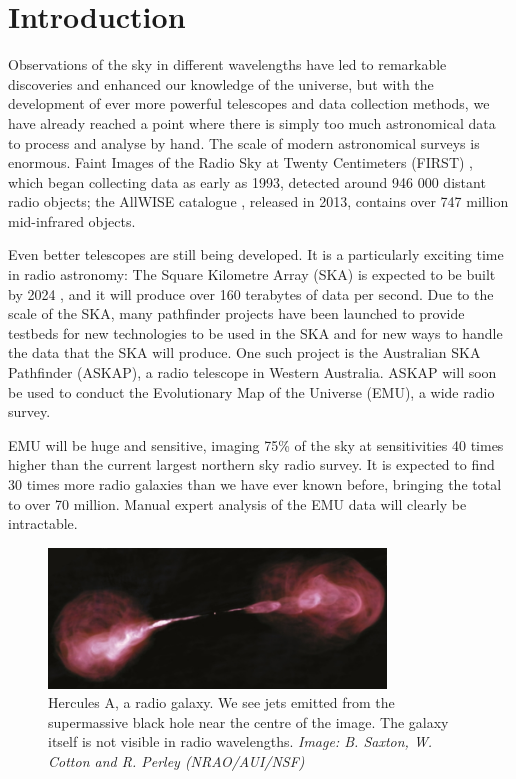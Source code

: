 
\chapter{Introduction}
\label{cha:intro}

Observations of the sky in different wavelengths have led to remarkable
discoveries and enhanced our knowledge of the universe, but with the development
of ever more powerful telescopes and data collection methods, we have already
reached a point where there is simply too much astronomical data to process and
analyse by hand. The scale of modern astronomical surveys is enormous. Faint
Images of the Radio Sky at Twenty Centimeters (FIRST) \citep{becker95}, which
began collecting data as early as 1993, detected around 946 000 distant radio
objects; the AllWISE catalogue \citep{cutri13}, released in 2013, contains over
747 million mid-infrared objects.

Even better telescopes are still being developed. It is a particularly exciting
time in radio astronomy: The Square Kilometre Array (SKA) is expected to be
built by 2024 \citep{ska}, and it will produce over 160 terabytes of data per
second. Due to the scale of the SKA, many pathfinder projects have been launched
to provide testbeds for new technologies to be used in the SKA and for new ways
to handle the data that the SKA will produce. One such project is the Australian
SKA Pathfinder (ASKAP), a radio telescope in Western Australia. ASKAP will soon
be used to conduct the Evolutionary Map of the Universe (EMU), a wide radio
survey.

EMU will be huge and sensitive, imaging 75\% of the sky at sensitivities 40
times higher than the current largest northern sky radio survey. It is expected
to find 30 times more radio galaxies than we have ever known before, bringing
the total to over 70 million. Manual expert analysis of the EMU data will
clearly be intractable.

\begin{figure}
  \centering
  \includegraphics[width=0.8\textwidth]{images/herculesA.jpg}
  \caption{Hercules A, a radio galaxy. We see jets emitted from the supermassive
    black hole near the centre of the image. The galaxy itself is not visible in
    radio wavelengths. \emph{Image: B. Saxton, W. Cotton and R. Perley
    (NRAO/AUI/NSF)}}
  \label{fig:radio-galaxy}
\end{figure}


